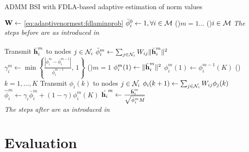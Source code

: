 \documentclass{article}
\begin{document}
\begin{algorithm}[t]
    \caption{ADMM BSI with FDLA-based adaptive estimation of norm values}\label{alg:davg_norm_est}
    \(\bm{\mathrm{W}} \gets\) \eqref{eq:adaptivenormest:fdlaminprob}\;
    \(\bar{\phi}_i^{0} \gets 1, \forall i \in \mathcal{M}\)\;
    \For(){\(m=1\dots\)}
    {
        \For(){\(i \in \mathcal{M}\)}
        {
            \emph{The steps before are as introduced in }\cite{blochbergerDBSI}\\
            \dotfill\\
            Transmit \(\bar{\bm{\mathrm{h}}}_i^{m}\) to nodes  \(j \in \mathcal{N}_i\)\;
            \(\bar{\phi}_i^{m} \gets \sum_{j \in \mathcal{N}_i} W_{ij} \|\bar{\bm{\mathrm{h}}}_i^m\|^2\)\;
            \(\gamma_i^{m} \gets \min \left\lbrace \frac{| \bar{\phi}_i^{m} - \bar{\phi}_i^{m-1} |}{\bar{\phi}_i^{m-1}},\,1\right\rbrace\)\;
            \eIf(){\(m = 1\)}
            {
                \(\phi_i^{m}(1) \gets \|\bar{\bm{\mathrm{h}}}_i^m\|^2\)\;
            }
            {
                \(\phi_i^{m}(1) \gets \phi_i^{m-1}(K)\)\;
            }
            \For(){\(k=1,\dots,K\)}
            {
                Transmit \(\phi_i(k)\) to nodes  \(j \in \mathcal{N}_i\)\;
                \(\phi_i({k+1}) \gets \sum_{j \in \mathcal{N}_i} W_{ij} \phi_j({k})\)\;
            }
            \(\hat{\phi}_i^{m} \gets \gamma_i \bar{\phi}_i^{m} + (1-\gamma) \phi_i^{m}(K)\)\;
            \(\hat{\bm{\mathrm{h}}_i}^{m} \gets \frac{\bar{\bm{\mathrm{h}}}_i^{m}}{\sqrt{\hat{\phi}_i^{m}M}}\)\;
            \dotfill\\
            \emph{The steps after are as introduced in }\cite{blochbergerDBSI}\\
        }
    }
\end{algorithm}



\section{Evaluation}
\label{sec:simulations}
\end{document}
